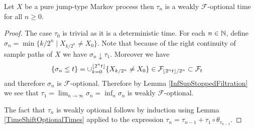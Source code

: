 \begin{lem}Let $X$ be a pure jump-type Markov process then
$\tau_n$ is a weakly $\mathcal{F}$-optional time for all $n \geq 0$.
\end{lem}
\begin{proof}
The case $\tau_0$ is trivial as it is a deterministic time.
For each $n \in \mathbb{N}$, define $\sigma_n = \min \lbrace k/2^n \mid
X_{k/2^n} \neq X_0 \rbrace$.  Note that because of the right
continuity of sample paths of $X$ we have $\sigma_n \downarrow
\tau_1$.  Moreover we have
\begin{align*}
\lbrace \sigma_n \leq t \rbrace &= \cup_{k=0}^{\left \lfloor 2^n t \right \rfloor}
\lbrace X_{k/2^n} \neq X_0 \rbrace 
\in \mathcal{F}_{\left \lfloor 2^n t \right \rfloor/2^n} \subset \mathcal{F}_t
\end{align*}
and therefore $\sigma_n$ is $\mathcal{F}$-optional.  Therefore by
Lemma \ref{InfSupStoppedFiltration} we see that $\tau_1 = \lim_{n
  \to\infty} \sigma_n = \inf_n \sigma_n$ is weakly
$\mathcal{F}$-optional.

The fact that $\tau_{n}$ is weakly optional follows by induction using
Lemma
\ref{TimeShiftOptionalTimes} applied to the expression $\tau_n =
\tau_{n-1} + \tau_1 \circ \theta_{\tau_{n-1}}$.
\end{proof}

